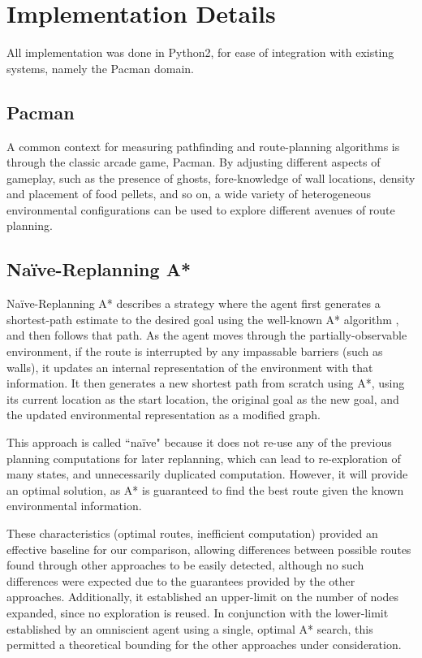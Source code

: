 
\section{Implementation Details}\label{sec:implementation}

	All implementation was done in Python2, for ease of integration with existing systems, namely the Pacman domain. 

\subsection{Pacman}

	A common context for measuring pathfinding and route-planning algorithms is through the classic arcade game, Pacman. By adjusting different aspects of gameplay, such as the presence of ghosts, fore-knowledge of wall locations, density and placement of food pellets, and so on, a wide variety of heterogeneous environmental configurations can be used to explore different avenues of route planning.
	
	

\subsection{Naïve-Replanning A*}

	Naïve-Replanning A* describes a strategy where the agent first generates a shortest-path estimate to the desired goal using the well-known A* algorithm \cite{hart1968formal}, and then follows that path. As the agent moves through the partially-observable environment, if the route is interrupted by any impassable barriers (such as walls), it updates an internal representation of the environment with that information. It then generates a new shortest path from scratch using A*, using its current location as the start location, the original goal as the new goal, and the updated environmental representation as a modified graph.
	
	This approach is called ``naïve" because it does not re-use any of the previous planning computations for later replanning, which can lead to re-exploration of many states, and unnecessarily duplicated computation. However, it will provide an optimal solution, as A* is guaranteed to find the best route given the known environmental information.
	
	These characteristics (optimal routes, inefficient computation) provided an effective baseline for our comparison, allowing differences between possible routes found through other approaches to be easily detected, although no such differences were expected due to the guarantees provided by the other approaches. Additionally, it established an upper-limit on the number of nodes expanded, since no exploration is reused. In conjunction with the lower-limit established by an omniscient agent using a single, optimal A* search, this permitted a theoretical bounding for the other approaches under consideration.


